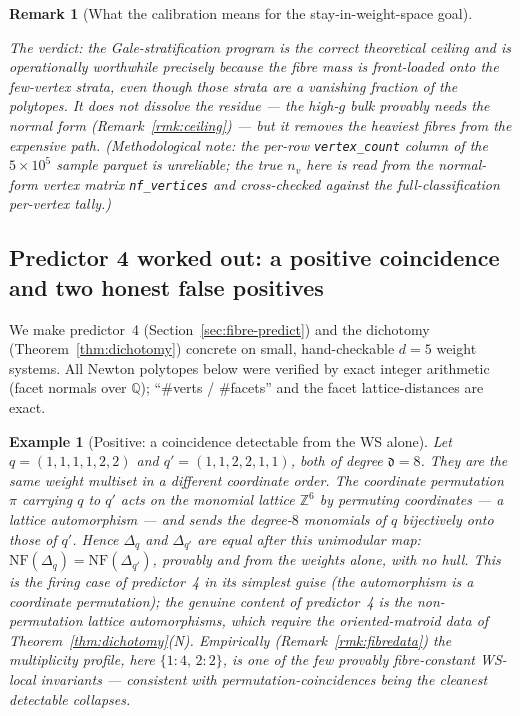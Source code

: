 \documentclass{amsart}
\newtheorem{example}[theorem]{Example}
\newtheorem{remark}[theorem]{Remark}
\begin{document}
\begin{remark}[What the calibration means for the stay-in-weight-space goal]
\begin{enumerate}
\end{enumerate}
The verdict: the Gale-stratification program is the correct theoretical ceiling
and is \emph{operationally worthwhile precisely because the fibre mass is
front-loaded onto the few-vertex strata}, even though those strata are a
vanishing fraction of the polytopes. It does \emph{not} dissolve the residue ---
the high-$g$ bulk provably needs the normal form (Remark~\ref{rmk:ceiling}) ---
but it removes the heaviest fibres from the expensive path. (Methodological note:
the per-row \texttt{vertex\_count} column of the $5\times10^{5}$ \emph{sample}
parquet is unreliable; the true $n_v$ here is read from the normal-form vertex
matrix \texttt{nf\_vertices} and cross-checked against the full-classification
per-vertex tally.)
\end{remark}

\subsection{Predictor 4 worked out: a positive coincidence and two honest
false positives}\label{sec:fibre-worked}

We make predictor~4 (Section~\ref{sec:fibre-predict}) and the dichotomy
(Theorem~\ref{thm:dichotomy}) concrete on small, hand-checkable $d=5$ weight
systems. All Newton polytopes below were verified by exact integer arithmetic
(facet normals over $\mathbb Q$); ``$\#$verts / $\#$facets'' and the facet
lattice-distances are exact.

\begin{example}[Positive: a coincidence detectable from the WS alone]
\label{ex:positive}
Let $q=(1,1,1,1,2,2)$ and $q'=(1,1,2,2,1,1)$, both of degree $\mathfrak d=8$.
They are the \emph{same weight multiset} in a different coordinate order. The
coordinate permutation $\pi$ carrying $q$ to $q'$ acts on the monomial lattice
$\mathbb Z^{6}$ by permuting coordinates --- a \emph{lattice automorphism} --- and
sends the degree-$8$ monomials of $q$ bijectively onto those of $q'$. Hence
$\Delta_{q}$ and $\Delta_{q'}$ are equal after this unimodular map:
$\mathrm{NF}(\Delta_q)=\mathrm{NF}(\Delta_{q'})$, \emph{provably and from the
weights alone}, with no hull. This is the firing case of predictor~4 in its
simplest guise (the automorphism is a coordinate permutation); the genuine
content of predictor~4 is the \emph{non}-permutation lattice automorphisms,
which require the oriented-matroid data of
Theorem~\ref{thm:dichotomy}(N). Empirically (Remark~\ref{rmk:fibredata}) the
multiplicity profile, here $\{1{:}4,\,2{:}2\}$, is one of the few provably
fibre-constant WS-local invariants --- consistent with permutation-coincidences
being the cleanest detectable collapses.
\end{example}
\end{document}
